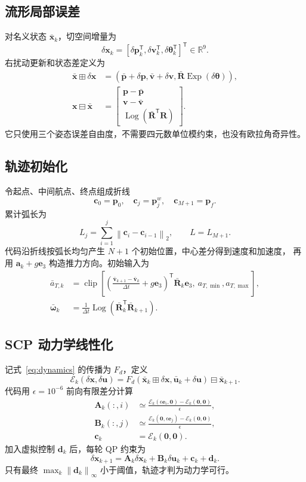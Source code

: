 \documentclass[UTF8,a4paper,11pt]{ctexart}
\newcommand{\ExpSO}{\operatorname{Exp}}
\newcommand{\LogSO}{\operatorname{Log}}
\newcommand{\clipop}{\operatorname{clip}}
\newcommand{\nTwo}[1]{\left\lVert#1\right\rVert_2}
\newcommand{\nInf}[1]{\left\lVert#1\right\rVert_\infty}
\begin{document}
\subsection{流形局部误差}

对名义状态 $\bar{\bm x}_k$，切空间增量为
\[
 \delta\bm x_k=[\delta\bm p_k^\mathsf T,\delta\bm v_k^\mathsf T,
 \delta\bm\theta_k^\mathsf T]^\mathsf T\in\mathbb R^9.
\]
右扰动更新和状态差定义为
\begin{align}
 \bar{\bm x}\boxplus\delta\bm x
 &=\left(\bar{\bm p}+\delta\bm p,\bar{\bm v}+\delta\bm v,
 \bar{\bm R}\ExpSO(\delta\bm\theta)\right),\\
 \bm x\boxminus\bar{\bm x}
 &=\begin{bmatrix}\bm p-\bar{\bm p}\\
 \bm v-\bar{\bm v}\\
 \LogSO(\bar{\bm R}^{\mathsf T}\bm R)\end{bmatrix}.
\end{align}
它只使用三个姿态误差自由度，不需要四元数单位模约束，也没有欧拉角奇异性。

\subsection{轨迹初始化}

令起点、中间航点、终点组成折线
\[
 \bm c_0=\bm p_0,\quad \bm c_j=\bm p_j^w,\quad
 \bm c_{M+1}=\bm p_f.
\]
累计弧长为
\[
 L_j=\sum_{i=1}^{j}\nTwo{\bm c_i-\bm c_{i-1}},\qquad L=L_{M+1}.
\]
代码沿折线按弧长均匀产生 $N+1$ 个初始位置，中心差分得到速度和加速度，
再用 $\bm a_k+g\bm e_3$ 构造推力方向。初始输入为
\begin{align}
 \bar a_{T,k}&=\clipop\left[
 \left(\frac{\bar{\bm v}_{k+1}-\bar{\bm v}_k}{\Delta t}+g\bm e_3\right)^\mathsf T
 \bar{\bm R}_k\bm e_3,\ a_{T,\min},a_{T,\max}\right],\\
 \bar{\bm\omega}_k&=\frac1{\Delta t}
 \LogSO(\bar{\bm R}_k^\mathsf T\bar{\bm R}_{k+1}).
\end{align}

\subsection{SCP 动力学线性化}

记式~\eqref{eq:dynamics} 的传播为 $F_d$，定义
\[
 \mathcal E_k(\delta\bm x,\delta\bm u)=
 F_d(\bar{\bm x}_k\boxplus\delta\bm x,\bar{\bm u}_k+\delta\bm u)
 \boxminus\bar{\bm x}_{k+1}.
\]
代码用 $\epsilon=10^{-6}$ 前向有限差分计算
\begin{align}
 \bm A_k(:,i)&\simeq\frac{\mathcal E_k(\epsilon\bm e_i,\bm0)
 -\mathcal E_k(\bm0,\bm0)}{\epsilon},\\
 \bm B_k(:,j)&\simeq\frac{\mathcal E_k(\bm0,\epsilon\bm e_j)
 -\mathcal E_k(\bm0,\bm0)}{\epsilon},\\
 \bm c_k&=\mathcal E_k(\bm0,\bm0).
\end{align}
加入虚拟控制 $\bm d_k$ 后，每轮 QP 约束为
\begin{equation}
 \delta\bm x_{k+1}=\bm A_k\delta\bm x_k+\bm B_k\delta\bm u_k
 +\bm c_k+\bm d_k.
 \label{eq:scp-dyn}
\end{equation}
只有最终 $\max_k\nInf{\bm d_k}$ 小于阈值，轨迹才判为动力学可行。
\end{document}
